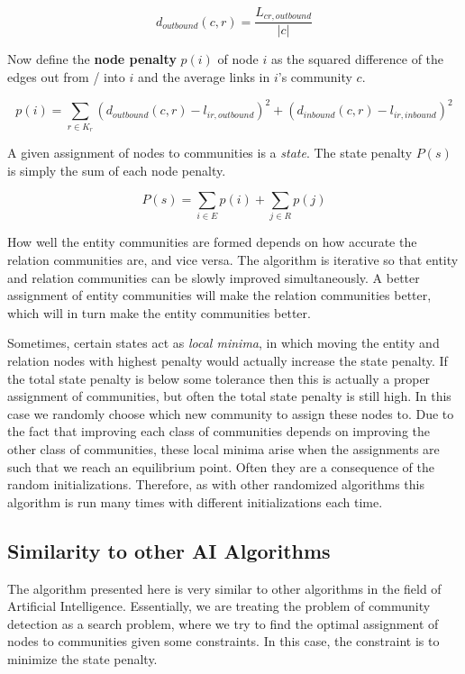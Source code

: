 \documentclass[12pt]{article}
\begin{document}
$$d_{outbound}(c,r) = \frac{L_{cr, outbound}}{|c|}$$

Now define the \textbf{node penalty} $p(i)$ of node $i$ as the squared difference
of the edges out from / into $i$ and the average links in $i$'s community $c$.

$$p(i) = \sum_{r \in K_r} (d_{outbound}(c,r) - l_{ir,outbound})^2 +
(d_{inbound}(c,r) - l_{ir, inbound})^2 $$

A given assignment of nodes to communities is a \textit{state}. The state penalty
$P(s)$ is simply the sum of each node penalty.

$$P(s) = \sum_{i \in E} p(i) + \sum_{j \in R} p(j)$$

How well the entity communities are formed depends on how accurate the relation
communities are, and vice versa. The algorithm is iterative so that entity and
relation communities can be slowly improved simultaneously. A better assignment
of entity communities will make the relation communities better, which will in
turn make the entity communities better.

Sometimes, certain states act as \textit{local minima}, in which moving the
entity and relation nodes with highest penalty would actually increase the state
penalty. If the total state penalty is below some tolerance then this is
actually a proper assignment of communities, but often the total state penalty
is still high. In this case we randomly choose which new community to assign
these nodes to. Due to the fact that improving each class of communities depends
on improving the other class of communities, these local minima arise when the
assignments are such that we reach an equilibrium point. Often they are a
consequence of the random initializations. Therefore, as with other randomized
algorithms this algorithm is run many times with different initializations each
time.

\subsection{Similarity to other AI Algorithms}
\label{Similarity to other AI Algorithms}

The algorithm presented here is very similar to other algorithms in the field of
Artificial Intelligence. Essentially, we are treating the problem of community
detection as a search problem, where we try to find the optimal assignment
of nodes to communities given some constraints. In this case, the constraint is
to minimize the state penalty.
\end{document}
